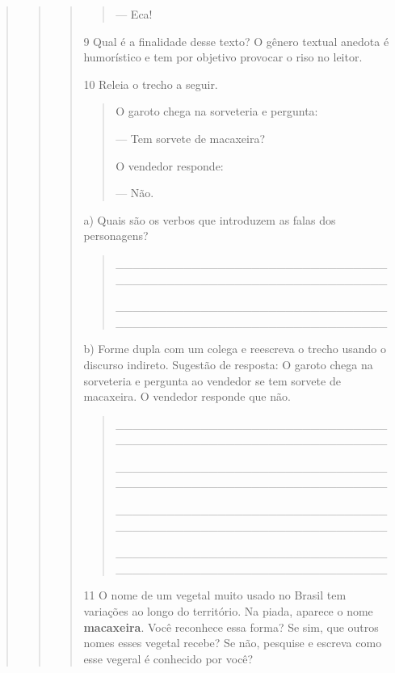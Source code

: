 \begin{quote}
\begin{quote}
\begin{quote}
\begin{quote}
--- Eca!

\end{quote}

\num{9} Qual é a finalidade desse texto? O gênero
textual anedota é humorístico e tem por objetivo provocar o riso no
leitor.


\num{10} Releia o trecho a seguir.

\begin{quote}
O garoto chega na sorveteria e pergunta:

--- Tem sorvete de macaxeira?

O vendedor responde:

--- Não.
\end{quote}

a) Quais são os verbos que introduzem as falas dos personagens? 


\begin{quote}
\_\_\_\_\_\_\_\_\_\_\_\_\_\_\_\_\_\_\_\_\_\_\_\_\_\_\_\_\_\_\_\_\_\_\_\_\_\_\_\_\_\_\_\_\_\_\_\_\_\_\_\_\_\_\_\_\_\_\_\_\_\_\_\_

\_\_\_\_\_\_\_\_\_\_\_\_\_\_\_\_\_\_\_\_\_\_\_\_\_\_\_\_\_\_\_\_\_\_\_\_\_\_\_\_\_\_\_\_\_\_\_\_\_\_\_\_\_\_\_\_\_\_\_\_\_\_\_\_
\end{quote}

b) Forme dupla com um colega e reescreva o trecho usando o discurso
indireto. Sugestão de resposta: O garoto chega na sorveteria e pergunta
ao vendedor se tem sorvete de macaxeira. O vendedor responde que não.

\begin{quote}
\_\_\_\_\_\_\_\_\_\_\_\_\_\_\_\_\_\_\_\_\_\_\_\_\_\_\_\_\_\_\_\_\_\_\_\_\_\_\_\_\_\_\_\_\_\_\_\_\_\_\_\_\_\_\_\_\_\_\_\_\_\_\_\_

\_\_\_\_\_\_\_\_\_\_\_\_\_\_\_\_\_\_\_\_\_\_\_\_\_\_\_\_\_\_\_\_\_\_\_\_\_\_\_\_\_\_\_\_\_\_\_\_\_\_\_\_\_\_\_\_\_\_\_\_\_\_\_\_

\_\_\_\_\_\_\_\_\_\_\_\_\_\_\_\_\_\_\_\_\_\_\_\_\_\_\_\_\_\_\_\_\_\_\_\_\_\_\_\_\_\_\_\_\_\_\_\_\_\_\_\_\_\_\_\_\_\_\_\_\_\_\_\_

\_\_\_\_\_\_\_\_\_\_\_\_\_\_\_\_\_\_\_\_\_\_\_\_\_\_\_\_\_\_\_\_\_\_\_\_\_\_\_\_\_\_\_\_\_\_\_\_\_\_\_\_\_\_\_\_\_\_\_\_\_\_\_\_
\end{quote}

\num{11} O nome de um vegetal muito usado no Brasil tem variações ao longo do território.
Na piada, aparece o nome \textbf{macaxeira}. Você reconhece essa forma? Se sim, que outros
nomes esses vegetal recebe? Se não, pesquise e escreva como esse vegeral é conhecido por
você?


\end{quote}
\end{quote}
\end{quote}
